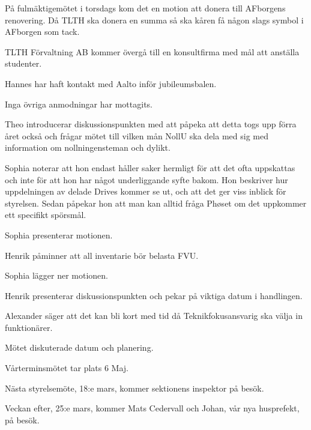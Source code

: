 \documentclass[10pt]{article}
\begin{document}
\begin{paragrafer}
\begin{paragrafer}
På fulmäktigemötet i torsdags kom det en motion att donera till AFborgens renovering.
Då TLTH ska donera en summa så ska kåren få någon slags symbol i AFborgen som tack.

TLTH Förvaltning AB kommer övergå till en konsultfirma med mål att anställa studenter.


Hannes har haft kontakt med Aalto inför jubileumsbalen.

Inga övriga anmodningar har mottagits.

\end{paragrafer}


Theo introducerar diskussionspunkten med att påpeka att detta togs upp förra året också och frågar mötet till vilken mån NollU ska dela med sig med information om nollningensteman och dylikt.

Sophia noterar att hon endast håller saker hermligt för att det ofta uppskattas och inte för att hon har något underliggande syfte bakom.
Hon beskriver hur uppdelningen av delade Drives kommer se ut, och att det ger viss inblick för styrelsen.
Sedan påpekar hon att man kan alltid fråga Phøset om det uppkommer ett specifikt spörsmål.


Sophia presenterar motionen.

Henrik påminner att all inventarie bör belasta FVU.

\Mdf

Sophia lägger ner motionen.


Henrik presenterar diskussionspunkten och pekar på viktiga datum i handlingen.

Alexander säger att det kan bli kort med tid då Teknikfokusansvarig ska välja in funktionärer.

Mötet diskuterade datum och planering.

\Mba Vårterminsmötet tar plats 6 Maj.


Nästa styrelsemöte, 18:e mars, kommer sektionens inspektor på besök.

Veckan efter, 25:e mars, kommer Mats Cedervall och Johan, vår nya husprefekt, på besök.



\end{paragrafer}
\end{document}
